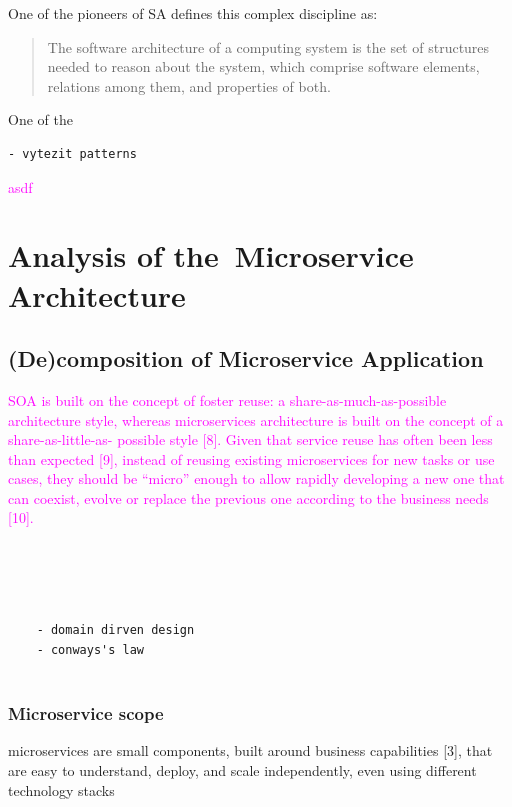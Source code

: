 \documentclass[thesis=M,english,hidelinks]{FITthesis}[2012/10/20]
\begin{document}
One of the pioneers of \acrshort{SA} defines this complex discipline as:
\begin{quote}
    The software architecture of a computing system is the set of structures needed to reason about the system, which comprise software elements, relations among them, and properties of both. \cite{documenting-sw-arch}
\end{quote}

One of the 




\begin{verbatim}
- vytezit patterns
\end{verbatim}
\textcolor{magenta}{
asdf
}



% 
% 

% 
% 

\chapter{Analysis of the~Microservice Architecture}
\label{sec:msa_analysis}

\section{(De)composition of Microservice Application}




\textcolor{magenta}{SOA is built on the concept of foster reuse: a share-as-much-as-possible architecture style, whereas microservices architecture is built on the concept of a share-as-little-as- possible style [8]. Given that service reuse has often been less than expected [9], instead of reusing existing microservices for new tasks or use cases, they should be “micro” enough to allow rapidly developing a new one that can coexist, evolve or replace the previous one according to the business needs [10].}





\begin{verbatim}




    - domain dirven design
    - conways's law
    
\end{verbatim}

\subsection{Microservice scope}
microservices are small components, built around business capabilities [3], that are easy to understand, deploy, and scale independently, even using different technology stacks
\end{document}
